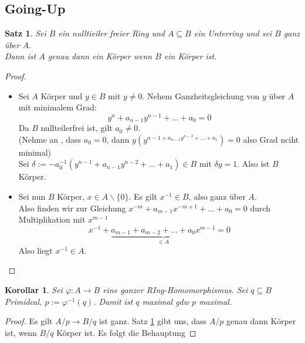 \documentclass[10pt,a4paper]{article}
\newcounter{thm}[section]
\theoremstyle{definition}
\theoremstyle{plain}
\newtheorem{kor}[thm]{Korollar}
\newtheorem{satz}[thm]{Satz}
\theoremstyle{remark}
\begin{document}
\subsection{Going-Up}

\begin{satz}\label{614Satz}
	Sei $B$ ein nulltieiler freier Ring und $A\subseteq B$ ein Unterring und sei $B$ ganz über $A$.\\
	Dann ist $A$ genau dann ein Körper wenn $B$ ein Körper ist.
\end{satz}
\begin{proof}
	\begin{itemize}
		\item Sei $A$ Körper und $y\in B$ mit $y\neq 0$. Nehem Ganzheitsgleichung von $y$ über $A$ mit minimalem Grad:\\
		\[y^n+a_{n-1}y^{n-1}+...+a_0=0\]
		Da $B$ nullteilerfrei ist, gilt $a_0\neq 0$.\\
		(Nehme an , dass $a_0=0$, dann $y(y^{n-1+a_{n-1}y^{n-2}+...+a_1})=0$ also Grad nciht minimal)\\
		Sei $\delta:=-a_0^{-1}(y^{n-1}+a_{n-1}y^{n-2}+...+a_1)\in B$ mit $\delta y=1.$ Also ist $B$ Körper.
		\item Sei nun $B$ Körper, $x\in A\backslash\{0\}$. Es gilt $x^{-1}\in B$, also ganz über $A$.\\
		Also finden wir zur Gleichung $x^{-m}+a_{m-1}x^{-m+1}+...+a_0=0$ durch Multiplikation mit $x^{m-1}$
		\[x^{-1}+\underbrace{a_{m-1}+a_{m-2}+...+a_0x^{m-1}}_{\in A}=0\]
		Also liegt $x^{-1}\in A$.
	\end{itemize}
\end{proof}

\begin{kor}\label{615Kor}
	Sei $\varphi: A\rightarrow B$ eine ganzer RIng-Homomorphismus. Sei $q\subseteq B$ Primideal, $p:=\varphi^{-1}(q)$. Damit ist $q$ maximal gdw $p$ maximal.
\end{kor}
\begin{proof}
	Es gilt $A/p\rightarrow B/q$ ist ganz. Satz \ref{614Satz} gibt uns, dass $A/p$ genau dann Körper ist, wenn $B/q$ Körper ist. Es folgt die Behauptung
\end{proof}
\end{document}
